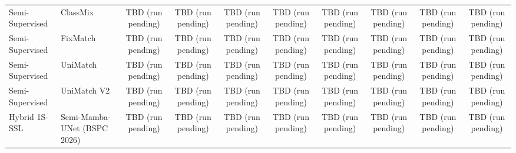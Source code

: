 \begin{table}[t]
{\begin{tabular}{l l cc cc cc cc}
Semi-Supervised & ClassMix & TBD (run pending) & TBD (run pending) & TBD (run pending) & TBD (run pending) & TBD (run pending) & TBD (run pending) & TBD (run pending) & TBD (run pending) \\
Semi-Supervised & FixMatch & TBD (run pending) & TBD (run pending) & TBD (run pending) & TBD (run pending) & TBD (run pending) & TBD (run pending) & TBD (run pending) & TBD (run pending) \\
Semi-Supervised & UniMatch & TBD (run pending) & TBD (run pending) & TBD (run pending) & TBD (run pending) & TBD (run pending) & TBD (run pending) & TBD (run pending) & TBD (run pending) \\
Semi-Supervised & UniMatch V2 & TBD (run pending) & TBD (run pending) & TBD (run pending) & TBD (run pending) & TBD (run pending) & TBD (run pending) & TBD (run pending) & TBD (run pending) \\
\midrule
Hybrid 1S-SSL & Semi-Mamba-UNet (BSPC 2026) & TBD (run pending) & TBD (run pending) & TBD (run pending) & TBD (run pending) & TBD (run pending) & TBD (run pending) & TBD (run pending) & TBD (run pending) \\
\bottomrule
\end{tabular}%
}
\end{table}